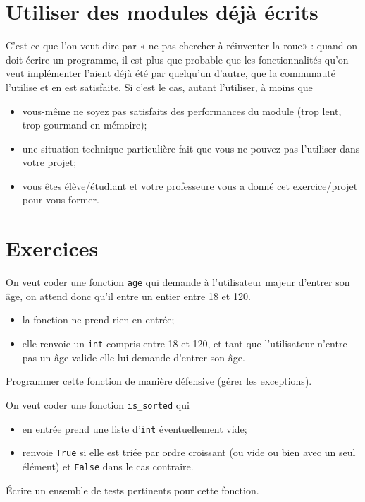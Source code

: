 \documentclass[a4paper,10pt,cours]{nsi}
\begin{document}
\section{Utiliser des modules déjà écrits}

C'est ce que l'on veut dire par « ne pas chercher à réinventer la roue» : quand on doit écrire un programme, il est plus que probable que les fonctionnalités qu'on veut implémenter l'aient déjà été par quelqu'un d'autre, que la communauté l'utilise et en est satisfaite. Si c'est le cas, autant l'utiliser, à moins que
\begin{itemize}
    \item   vous-même ne soyez pas satisfaits des performances du module (trop lent, trop gourmand en mémoire);
    \item   une situation technique particulière fait que vous ne pouvez pas l'utiliser dans votre projet;
    \item   vous êtes élève/étudiant et votre professeur\cdot e vous a donné cet exercice/projet pour vous former.
\end{itemize}
\section{Exercices}
\begin{exercice}
    On veut coder une fonction \texttt{age} qui demande à l'utilisateur majeur d'entrer son âge, on attend donc qu'il entre un entier entre 18 et 120.
    \begin{itemize}
        \item   la fonction ne prend rien en entrée;
        \item   elle renvoie un \texttt{int} compris entre 18 et 120, et tant que l'utilisateur n'entre pas un âge valide elle lui demande d'entrer son âge.
    \end{itemize}
    Programmer cette fonction de manière défensive (gérer les exceptions).
\end{exercice}

\begin{exercice}[]
    On veut coder une fonction \texttt{is_sorted} qui 
    \begin{itemize}
        \item   en entrée prend une liste d'\texttt{int} éventuellement vide;
        \item   renvoie \texttt{True} si elle est triée par ordre croissant (ou vide ou bien avec un seul élément) et \texttt{False} dans le cas contraire.
    \end{itemize}
    \'Ecrire un ensemble de tests pertinents pour cette fonction.
\end{exercice}
\end{document}
